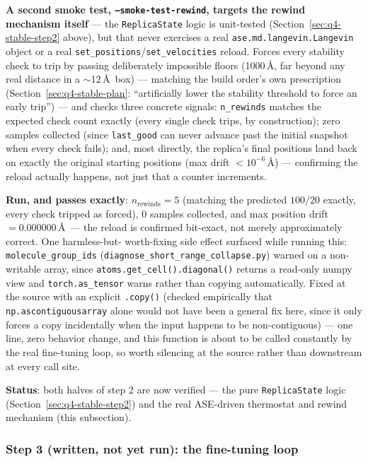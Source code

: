 \documentclass[11pt]{article}
\begin{document}
\textbf{A second smoke test, \texttt{--smoke-test-rewind}, targets the
rewind mechanism itself} --- the \texttt{ReplicaState} logic is unit-tested
(Section~\ref{sec:q4-stable-step2} above), but that never exercises a real
\texttt{ase.md.langevin.Langevin} object or a real
\texttt{set\_positions}/\texttt{set\_velocities} reload. Forces every
stability check to trip by passing deliberately impossible floors (1000\,\AA,
far beyond any real distance in a $\sim$12\,\AA\ box) --- matching the
build order's own prescription (Section~\ref{sec:q4-stable-plan}:
``artificially lower the stability threshold to force an early trip'')
--- and checks three concrete signals: \texttt{n\_rewinds} matches the
expected check count exactly (every single check trips, by construction);
zero samples collected (since \texttt{last\_good} can never advance past
the initial snapshot when every check fails); and, most directly, the
replica's final positions land back on exactly the original starting
positions (max drift $<10^{-6}$\,\AA) --- confirming the reload actually
happens, not just that a counter increments.

\textbf{Run, and passes exactly}: $n_{\text{rewinds}}=5$ (matching the
predicted $100/20$ exactly, every check tripped as forced), 0 samples
collected, and max position drift $=0.000000$\,\AA\ --- the reload is
confirmed bit-exact, not merely approximately correct. One harmless-but-
worth-fixing side effect surfaced while running this:
\texttt{molecule\_group\_ids} (\texttt{diagnose\_short\_range\_collapse.py})
warned on a non-writable array, since \texttt{atoms.get\_cell().diagonal()}
returns a read-only numpy view and \texttt{torch.as\_tensor} warns rather
than copying automatically. Fixed at the source with an explicit
\texttt{.copy()} (checked empirically that \texttt{np.ascontiguousarray}
alone would not have been a general fix here, since it only forces a copy
incidentally when the input happens to be non-contiguous) --- one line,
zero behavior change, and this function is about to be called constantly
by the real fine-tuning loop, so worth silencing at the source rather than
downstream at every call site.

\textbf{Status}: both halves of step 2 are now verified --- the pure
\texttt{ReplicaState} logic (Section~\ref{sec:q4-stable-step2}) and the
real ASE-driven thermostat and rewind mechanism (this subsection).

\subsubsection{Step 3 (written, not yet run): the fine-tuning loop}
\label{sec:q4-stable-step3}
\end{document}
